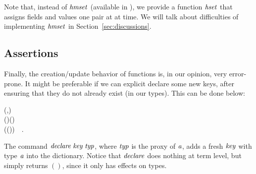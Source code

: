 Note that, instead of \ensuremath{\Varid{hmset}} (available in \Hedis{}), we
provide a function \ensuremath{\Varid{hset}} that assigns fields and values one pair at at time.
We will talk about difficulties of implementing \ensuremath{\Varid{hmset}} in
Section~\ref{sec:discussions}.

\subsection{Assertions}
\label{sec:assertions}

%


Finally, the creation/update behavior of \Redis{} functions is, in our opinion,
very error-prone. It might be preferable if we can explicit declare some new
keys, after ensuring that they do not already exist (in our types). This can be done below:
\begin{hscode}\SaveRestoreHook
{}%
%
%
\>[B]{}\<[10]%
\>[10]{}\mathbin{::}(\;,\;\;\mathrel{\sim}){}\<[E]%
\\
\>[10]{}\Rightarrow {}\;\to {}\;\to {}\;\;(\;\;\;)\;(){}\<[E]%
\\
\>[B]{}\;\;\mathrel{=}\;(\;())~~.{}\<[E]%
\ColumnHook
\end{hscode}\resethooks
The command \ensuremath{\Varid{declare}\;\Varid{key}\;\Varid{typ}}, where \ensuremath{\Varid{typ}} is the proxy of \ensuremath{\Varid{a}}, adds a fresh
 \ensuremath{\Varid{key}} with type \ensuremath{\Varid{a}} into the dictionary. Notice that \ensuremath{\Varid{declare}} does nothing at
 term level, but simply returns \ensuremath{()}, since it only has effects on types.

